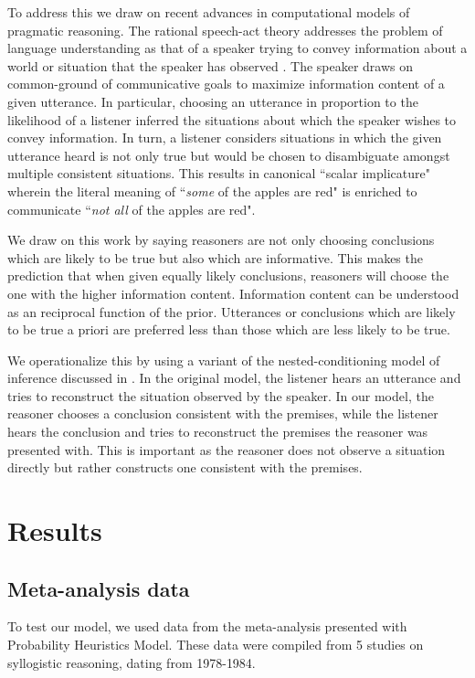 \documentclass[10pt,letterpaper]{article}
\begin{document}
To address this we draw on recent advances in computational models of pragmatic reasoning. The rational speech-act theory addresses the problem of language understanding as that of a speaker trying to convey information about a world or situation that the speaker has observed \cite{Frank2012a}. The speaker draws on common-ground of communicative goals to maximize information content of a given utterance. In particular, choosing an utterance in proportion to the likelihood of a listener inferred the situations about which the speaker wishes to convey information. In turn, a listener considers situations in which the given utterance heard is not only true but would be chosen to disambiguate amongst multiple consistent situations. This results in canonical ``scalar implicature" wherein the literal meaning of ``{\em some} of the apples are red" is enriched to communicate ``{\em not all} of the apples are red".

We draw on this work by saying reasoners are not only choosing conclusions which are likely to be true but also which are informative. This makes the prediction that when given equally likely conclusions, reasoners will choose the one with the higher information content. Information content can be understood as an reciprocal function of the prior. Utterances or conclusions which are likely to be true a priori are preferred less than those which are less likely to be true. 

We operationalize this by using a variant of the nested-conditioning model of inference discussed in \cite{Goodman2013}. In the original model, the listener hears an utterance and tries to reconstruct the situation observed by the speaker. In our model, the reasoner chooses a conclusion consistent with the premises, while the listener hears the conclusion and tries to reconstruct the premises the reasoner was presented with. This is important as the reasoner does not observe a situation directly but rather constructs one consistent with the premises. 

\section{Results}

\subsection{Meta-analysis data}
To test our model, we used data from the meta-analysis presented with Probability Heuristics Model. These data were compiled from 5 studies on syllogistic reasoning, dating from 1978-1984. 
\end{document}
